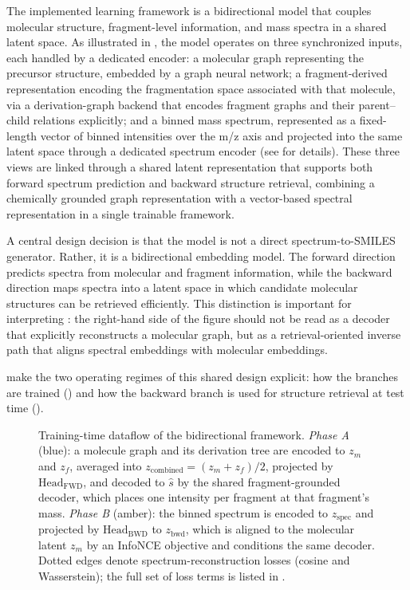 The implemented learning framework is a bidirectional model that couples molecular structure, fragment-level information, and mass spectra in a shared latent space.
As illustrated in , the model operates on three synchronized inputs, each handled by a dedicated encoder: a molecular graph representing the precursor structure, embedded by a graph neural network; a fragment-derived representation encoding the fragmentation space associated with that molecule, via a derivation-graph backend that encodes fragment graphs and their parent--child relations explicitly; and a binned mass spectrum, represented as a fixed-length vector of binned intensities over the m/z axis and projected into the same latent space through a dedicated spectrum encoder (see  for details).
These three views are linked through a shared latent representation that supports both forward spectrum prediction and backward structure retrieval, combining a chemically grounded graph representation with a vector-based spectral representation in a single trainable framework.


A central design decision is that the model is not a direct spectrum-to-SMILES generator.
Rather, it is a bidirectional embedding model.
The forward direction predicts spectra from molecular and fragment information, while the backward direction maps spectra into a latent space in which candidate molecular structures can be retrieved efficiently.
This distinction is important for interpreting :
the right-hand side of the figure should not be read as a decoder that explicitly reconstructs a molecular graph, but as a retrieval-oriented inverse path that aligns spectral embeddings with molecular embeddings.



 make the two operating regimes of this shared design explicit: how the branches are trained () and how the backward branch is used for structure retrieval at test time ().

\begin{figure}[H]
    \centering
    \resizebox{\textwidth}{!}{
        
    }
    \caption[Training dataflow]{
        Training-time dataflow of the bidirectional framework.
        \emph{Phase A} (blue): a molecule graph and its derivation tree are encoded to $z_m$ and $z_f$, averaged into $z_{\mathrm{combined}}=(z_m+z_f)/2$, projected by $\text{Head}_{\mathrm{FWD}}$, and decoded to $\widehat{s}$ by the shared fragment-grounded decoder, which places one intensity per fragment at that fragment's mass.
        \emph{Phase B} (amber): the binned spectrum is encoded to $z_{\mathrm{spec}}$ and projected by $\text{Head}_{\mathrm{BWD}}$ to $z_{\mathrm{bwd}}$, which is aligned to the molecular latent $z_m$ by an InfoNCE objective and conditions the same decoder.
        Dotted edges denote spectrum-reconstruction losses (cosine and Wasserstein); the full set of loss terms is listed in .
    }
    \label{fig:ml-architecture-training}
\end{figure}


